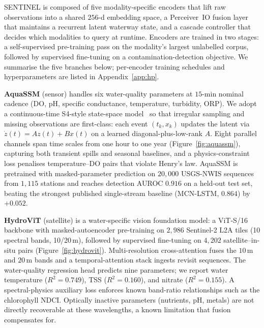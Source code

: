\documentclass{article}
\begin{document}
SENTINEL is composed of five modality-specific encoders that lift raw observations into a shared $256$-d embedding space, a Perceiver~IO fusion layer that maintains a recurrent latent waterway state, and a cascade controller that decides which modalities to query at runtime. Encoders are trained in two stages: a self-supervised pre-training pass on the modality's largest unlabelled corpus, followed by supervised fine-tuning on a contamination-detection objective. We summarise the five branches below; per-encoder training schedules and hyperparameters are listed in Appendix~\ref{app:hp}.

\textbf{AquaSSM} (sensor) handles six water-quality parameters at $15$-min nominal cadence (DO, pH, specific conductance, temperature, turbidity, ORP). We adopt a continuous-time S4-style state-space model~\citep{gu2022s4} so that irregular sampling and missing observations are first-class: each event $(t_k,x_k)$ updates the latent via $\dot z(t)\!=\!Az(t)+Bx(t)$ on a learned diagonal-plus-low-rank $A$. Eight parallel channels span time scales from one hour to one year (Figure~\ref{fig:aquassm}), capturing both transient spills and seasonal baselines, and a physics-constraint loss penalises temperature--DO pairs that violate Henry's law. AquaSSM is pretrained with masked-parameter prediction on $20{,}000$ USGS-NWIS sequences from $1{,}115$ stations and reaches detection AUROC $0.916$ on a held-out test set, beating the strongest published single-stream baseline (MCN-LSTM, $0.864$) by $+0.052$.

\textbf{HydroViT} (satellite) is a water-specific vision foundation model: a ViT-S/16 backbone with masked-autoencoder pre-training on $2{,}986$ Sentinel-2 L2A tiles (10 spectral bands, 10/20\,m), followed by supervised fine-tuning on $4{,}202$ satellite--in-situ pairs (Figure~\ref{fig:hydrovit}). Multi-resolution cross-attention fuses the $10$\,m and $20$\,m bands and a temporal-attention stack ingests revisit sequences. The water-quality regression head predicts nine parameters; we report water temperature ($R^2{=}0.749$), TSS ($R^2{=}0.160$), and nitrate ($R^2{=}0.155$). A spectral-physics auxiliary loss enforces known band-ratio relationships such as the chlorophyll NDCI. Optically inactive parameters (nutrients, pH, metals) are not directly recoverable at these wavelengths, a known limitation that fusion compensates for.
\end{document}
